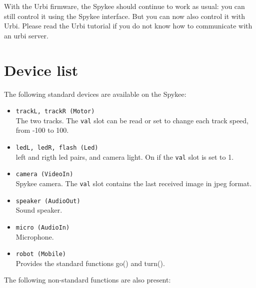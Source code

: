 With the Urbi firmware, the Spykee should continue to work as usual: you can
still control it using the Spykee interface. But you can now also control it
with Urbi. Please read the Urbi tutorial if you do not know how to communicate
with an urbi server.

\section{Device list}

The following standard devices are available on the Spykee:

\begin{itemize}
\item \lstinline|trackL, trackR (Motor)| \\
    The two tracks. The \lstinline|val| slot can be read or set to change each
    track speed, from -100 to 100.
\item \lstinline|ledL, ledR, flash (Led)| \\
    left and rigth led pairs, and camera light. On if the \lstinline|val| slot
    is set to 1.
\item \lstinline|camera (VideoIn)| \\
    Spykee camera. The \lstinline|val| slot contains the last received image
    in jpeg format.
\item \lstinline|speaker (AudioOut)| \\
    Sound speaker.
\item \lstinline|micro (AudioIn)| \\
    Microphone.
\item \lstinline|robot (Mobile)| \\
    Provides the standard functions go() and turn().
\end{itemize}

The following non-standard functions are also present:

